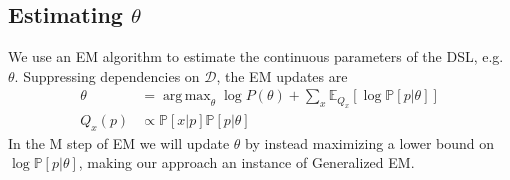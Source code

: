 \documentclass{article}
\DeclareMathOperator*{\argmax}{arg\,max} %
\newcommand{\expect}{\mathds{E}} %
\newcommand{\probability}{\mathds{P}} %
\begin{document}
\subsection{Estimating $\theta$}

We use an EM algorithm to estimate the continuous parameters of the DSL, e.g. $\theta$.
Suppressing dependencies on $\mathcal{D}$, the EM updates are
\begin{align}
\label{maximizeStep}  \theta& = \argmax_\theta \log P(\theta) + \sum_x \expect_{Q_x}\left[\log \probability\left[p|\theta \right] \right]\\
  Q_x(p)&\propto \probability[x|p]\probability[p|\theta]
  \end{align}
In the M step of EM we will update $\theta$ by instead maximizing a lower bound on $\log \probability[p|\theta]$,
making our approach an instance of Generalized EM.
\end{document}
